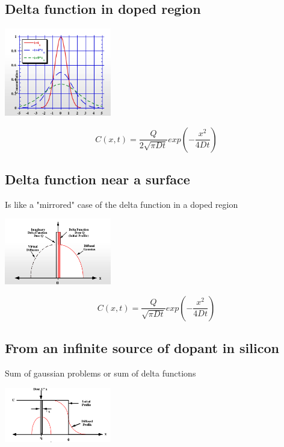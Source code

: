 \subsection{Delta function in doped region}

\centering
\includegraphics[width=0.35\textwidth]{delta_in.png}\\
\raggedright

\begin{equation}
C(x,t)=\frac{Q}{2\sqrt{\pi Dt}}exp\left(-\frac{x^2}{4Dt} \right)
\end{equation}


\subsection{Delta function near a surface}
Is like a "mirrored" case of the delta function in a doped region

\centering
\includegraphics[width=0.35\textwidth]{delta_surf.png}\\
\raggedright

\begin{equation}
C(x,t)=\frac{Q}{\sqrt{\pi Dt}}exp\left(-\frac{x^2}{4Dt} \right)
\end{equation}

\subsection{From an infinite source of dopant in silicon}
Sum of gaussian problems or sum of delta functions 

\centering
\includegraphics[width=0.35\textwidth]{inf_dop.png}\\
\raggedright


